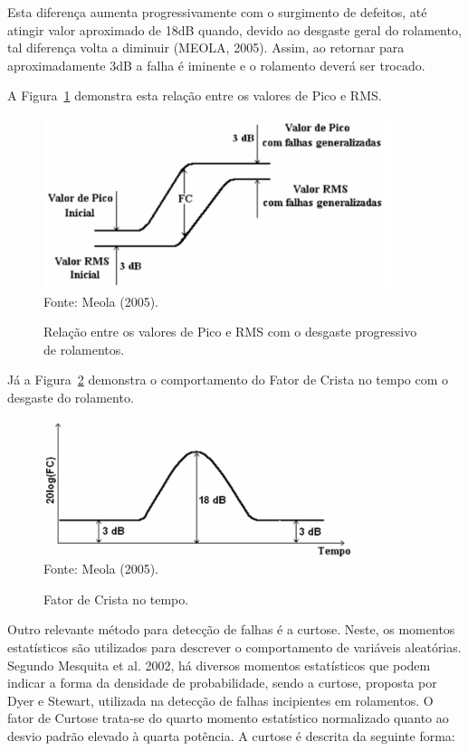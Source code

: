 \documentclass[
	12pt,				
	oneside,			
	a4paper,			
	english,			
	brazil,			
	]{abntex2ppgsi}
\begin{document}
Esta diferença aumenta progressivamente com o surgimento de defeitos, até atingir valor aproximado de 18dB quando, devido ao desgaste geral do rolamento, tal diferença volta a diminuir (MEOLA, 2005). Assim, ao retornar para aproximadamente 3dB a falha é iminente e o rolamento deverá ser trocado. 

A Figura~\ref{RelacaoPicoaPicoeRMS} demonstra esta relação entre os valores de Pico e RMS.  

\begin{figure}[!htb]
\centering
\caption {Relação entre os valores de Pico e RMS com o desgaste progressivo de rolamentos.}
\includegraphics[width=\textwidth,height=50mm,keepaspectratio]{Figura18} \\
Fonte: Meola (2005).
\label{RelacaoPicoaPicoeRMS}
\end{figure}	

Já a Figura~\ref{FatorCrista} demonstra o comportamento do Fator de Crista no tempo com o desgaste do rolamento.

\begin{figure}[!htb]
\centering
\caption {Fator de Crista no tempo.}
\includegraphics[width=\textwidth,height=40mm,keepaspectratio]{Figura19} \\
Fonte: Meola (2005).
\label{FatorCrista}
\end{figure}	

Outro relevante método para detecção de falhas é a curtose. Neste, os momentos estatísticos são utilizados para descrever o comportamento de variáveis aleatórias. Segundo Mesquita et al. 2002, há diversos momentos estatísticos que podem indicar a forma da densidade de probabilidade, sendo a curtose, proposta por Dyer e Stewart, utilizada na detecção de falhas incipientes em rolamentos. O fator de Curtose trata-se do quarto momento estatístico normalizado quanto ao desvio padrão elevado à quarta potência. A curtose é descrita da seguinte forma:
\end{document}

